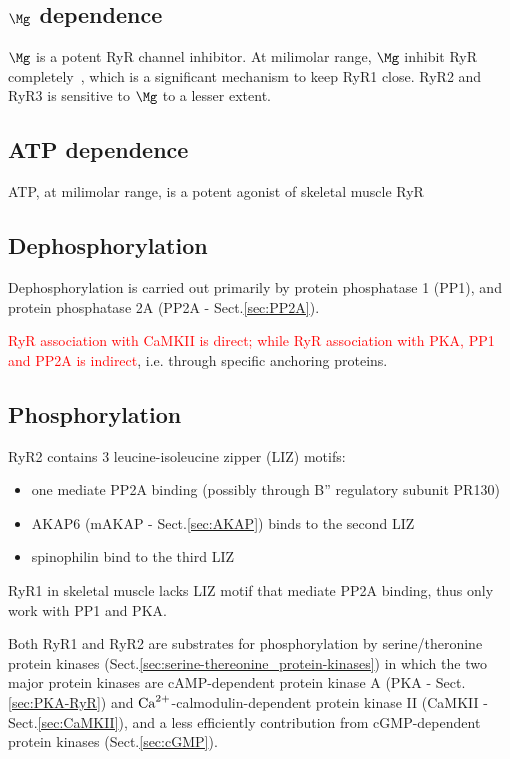 \subsection{$\Mg$ dependence}
\label{sec:RyR_Mg_inactivate}

$\Mg$ is a potent RyR channel inhibitor. At milimolar range, $\Mg$ inhibit RyR
completely~\citep{}, which is a significant mechanism to keep RyR1 close. RyR2
and RyR3 is sensitive to $\Mg$ to a lesser extent.


\subsection{ATP dependence}
\label{sec:RyR_ATP_dependence}

ATP, at milimolar range, is a potent agonist of skeletal muscle RyR

\subsection{Dephosphorylation}
\label{sec:RyR-dephosphorylation}


Dephosphorylation is carried out primarily by protein phosphatase 1 (PP1), and
protein phosphatase 2A (PP2A - Sect.\ref{sec:PP2A}).

\textcolor{red}{RyR association with CaMKII is direct; while RyR association
with PKA, PP1 and PP2A is indirect}, i.e. through specific anchoring proteins.

\subsection{Phosphorylation}
\label{sec:RyR_phosphorylation}

RyR2 contains 3 leucine-isoleucine zipper (LIZ) motifs:
\begin{itemize}
  \item one mediate PP2A binding (possibly through B'' regulatory subunit PR130)
  \item AKAP6 (mAKAP - Sect.\ref{sec:AKAP}) binds to the second LIZ
  \item spinophilin bind to the third LIZ
\end{itemize}

RyR1 in skeletal muscle lacks LIZ motif that mediate PP2A binding, thus only
work with PP1 and PKA.

Both RyR1 and RyR2 are substrates for phosphorylation by serine/theronine
protein kinases (Sect.\ref{sec:serine-thereonine_protein-kinases}) in which the
two major protein kinases are cAMP-dependent protein kinase A (PKA -
Sect.\ref{sec:PKA-RyR}) and ${\text{Ca}^{2+}}$-calmodulin-dependent protein kinase II (CaMKII -
Sect.\ref{sec:CaMKII}), and a less efficiently contribution from cGMP-dependent
protein kinases (Sect.\ref{sec:cGMP}).

